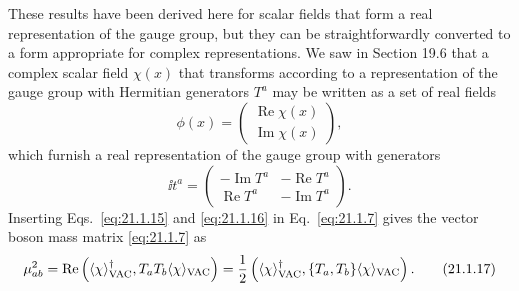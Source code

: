 These results have been derived here for scalar fields that form a real
representation of the gauge group, but they can be straightforwardly
converted to a form appropriate for complex representations. We saw in
Section 19.6 that a complex scalar field $\chi(x)$ that transforms according
to a representation of the gauge group with Hermitian generators $T^a$
may be written as a set of real fields
\begin{equation}
 \phi(x)=
 \begin{pmatrix}
  \operatorname{Re}\chi(x)\\
  \operatorname{Im}\chi(x)
 \end{pmatrix},
 \tag{21.1.15}\label{eq:21.1.15}
\end{equation}
which furnish a real representation of the gauge group with generators
\begin{equation}
 \ii t^a=
 \begin{pmatrix}
  -\operatorname{Im}T^a&-\operatorname{Re}T^a\\
  \operatorname{Re}T^a&-\operatorname{Im}T^a
 \end{pmatrix}.
 \tag{21.1.16}\label{eq:21.1.16}
\end{equation}
Inserting Eqs.~\eqref{eq:21.1.15} and \eqref{eq:21.1.16} in
Eq.~\eqref{eq:21.1.7} gives the vector boson mass matrix
\eqref{eq:21.1.7} as
\begin{equation}
 \mu^2_{ab}
 =\operatorname{Re}\left(
 \langle\chi\rangle_{\rm VAC}^\dagger,
 T_a T_b\langle\chi\rangle_{\rm VAC}\right)
 =\frac12\left(
 \langle\chi\rangle_{\rm VAC}^\dagger,
 \{T_a,T_b\}\langle\chi\rangle_{\rm VAC}\right).
 \tag{21.1.17}\label{eq:21.1.17}
\end{equation}

